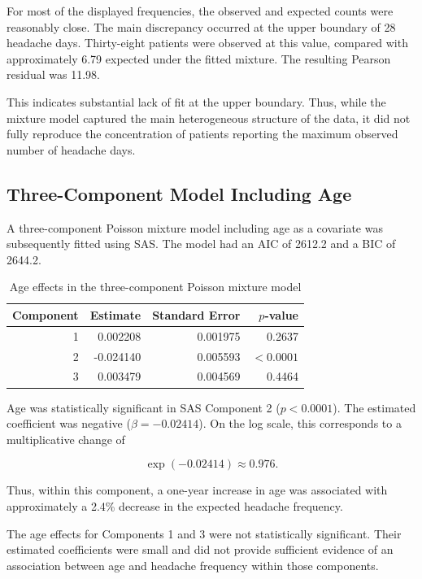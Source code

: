 For most of the displayed frequencies, the observed and expected
counts were reasonably close. The main discrepancy occurred at the
upper boundary of 28 headache days. Thirty-eight patients were
observed at this value, compared with approximately 6.79 expected
under the fitted mixture. The resulting Pearson residual was 11.98.

This indicates substantial lack of fit at the upper boundary. Thus,
while the mixture model captured the main heterogeneous structure of
the data, it did not fully reproduce the concentration of patients
reporting the maximum observed number of headache days.

\subsection{Three-Component Model Including Age}

A three-component Poisson mixture model including age as a
covariate was subsequently fitted using SAS. The model had an AIC of
2612.2 and a BIC of 2644.2.

\begin{table}[H]
\centering
\caption{Age effects in the three-component Poisson mixture model}
\label{tab:ageeffects}
\begin{tabular}{rrrr}
\toprule
Component & Estimate & Standard Error & $p$-value \\
\midrule
1 & 0.002208 & 0.001975 & 0.2637 \\
2 & -0.024140 & 0.005593 & $<0.0001$ \\
3 & 0.003479 & 0.004569 & 0.4464 \\
\bottomrule
\end{tabular}
\end{table}

Age was statistically significant in SAS Component 2
($p<0.0001$). The estimated coefficient was negative
($\beta=-0.02414$). On the log scale, this corresponds to a
multiplicative change of

\[
\exp(-0.02414) \approx 0.976.
\]

Thus, within this component, a one-year increase in age was
associated with approximately a 2.4\% decrease in the expected
headache frequency.

The age effects for Components 1 and 3 were not statistically
significant. Their estimated coefficients were small and did not
provide sufficient evidence of an association between age and
headache frequency within those components.

